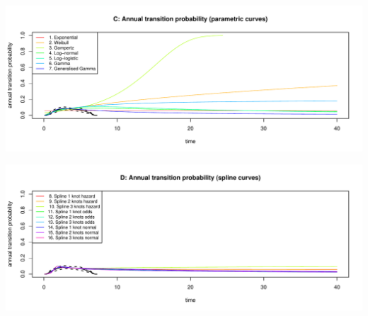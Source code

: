 \documentclass[]{article}
\begin{document}
\begin{flushleft}\includegraphics[height=0.29\textheight]{Images/validate_extrapolation1-3} \end{flushleft}

\begin{flushleft}\includegraphics[height=0.29\textheight]{Images/validate_extrapolation1-4} \end{flushleft}
\end{document}
